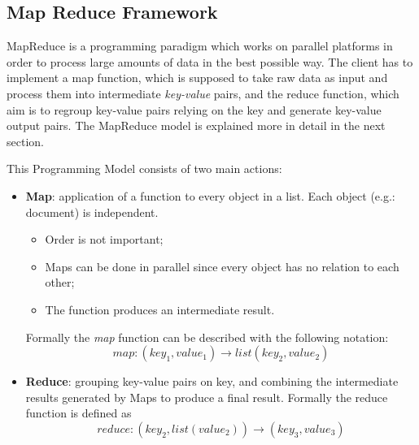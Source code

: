 \documentclass[a4paper,11pt, twoside]{article}
\begin{document}
		

	\subsection{Map Reduce Framework}
		MapReduce is a programming paradigm which works on parallel platforms in order to process large amounts of data in the best possible way. The client has to implement a map function, which is supposed to take raw data as input and process them into intermediate \textit{key-value} pairs, and the reduce function, which aim is to regroup key-value pairs relying on the key and generate key-value output pairs. The MapReduce model is explained more in detail in the next section.
		
		\bigskip

		\noindent
		This Programming Model consists of two main actions:
		\begin{itemize}
			\item \textbf{Map}: application of a function to every object in a list. Each object (e.g.: document) is independent.
			\begin{itemize}
				\item Order is not important;
				\item Maps can be done in parallel since every object has no relation to each other;
				\item The function produces an intermediate result.
			\end{itemize}
			Formally the \textit{map} function can be described with the following notation: \[ map:(key_1, value_1) \to list(key_2, value_2) \]
			\item \textbf{Reduce}: grouping key-value pairs on key, and combining the intermediate results generated by Maps to produce a final result. Formally the reduce function is defined as \[ reduce:(key_2, list(value_2)) \to (key_3, value_3)  \]
		\end{itemize}
\end{document}

